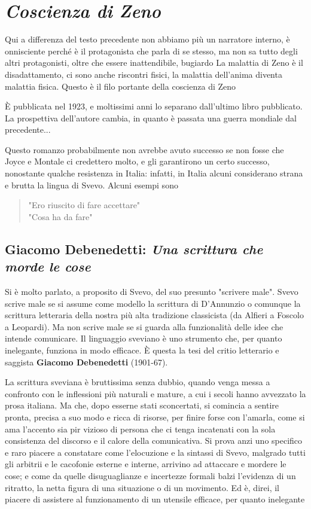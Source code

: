 \documentclass[a4paper, twoside, titlepage]{book}
\newcounter{mar}
\newcommand{\citazione}[1]{%
  \begin{quotation}
  \noindent #1
  \end{quotation}}
\begin{document}
\chapter{\textit{Coscienza di Zeno}}

Qui a differenza del testo precedente non abbiamo più un narratore interno, è onnisciente perché è il protagonista che parla di se stesso, ma non sa tutto degli altri protagonisti, oltre che essere inattendibile, bugiardo
La malattia di Zeno è il disadattamento, ci sono anche riscontri fisici, la malattia dell’anima diventa malattia fisica. Questo è il filo portante della coscienza di Zeno

È pubblicata nel 1923, e moltissimi anni lo separano dall'ultimo libro pubblicato.
La prospettiva dell'autore cambia, in quanto è passata una guerra mondiale dal precedente...

Questo romanzo probabilmente non avrebbe avuto successo se non fosse che Joyce e Montale ci credettero molto, e gli garantirono un certo successo, nonostante qualche resistenza in Italia: infatti, in Italia alcuni considerano strana e brutta la lingua di Svevo. Alcuni esempi sono
\citazione{"Ero riuscito di fare accettare"\\
"Cosa ha da fare"}

\section{Giacomo Debenedetti: \textit{Una scrittura che morde le cose}}
Si è molto parlato, a proposito di Svevo, del suo presunto "scrivere male". Svevo scrive male se si assume come modello la scrittura di D'Annunzio o comunque la scrittura letteraria della nostra più alta tradizione classicista (da Alfieri a Foscolo a Leopardi). Ma non scrive male se si guarda alla funzionalità delle idee che intende comunicare. Il linguaggio sveviano è uno strumento che, per quanto inelegante, funziona in modo efficace. È questa la tesi del critio letterario e saggista \textbf{Giacomo Debenedetti} (1901-67).

La scrittura sveviana è bruttissima senza dubbio, quando venga messa a confronto con le inflessioni più naturali e mature, a cui i secoli hanno avvezzato la prosa italiana. Ma che, dopo esserne stati sconcertati, si comincia a sentire pronta, precisa a suo modo e ricca di risorse, per finire forse con l'amarla, come si ama l'accento sia pir vizioso di persona che ci tenga incatenati con la sola consistenza del discorso e il calore della comunicativa. Si prova anzi uno specifico e raro piacere a constatare come l'elocuzione e la sintassi di Svevo, malgrado tutti gli arbitrii e le cacofonie esterne e interne, arrivino ad attaccare e mordere le cose; e come da quelle disuguaglianze e incertezze formali balzi l'evidenza di un ritratto, la netta figura di una situazione o di un movimento. Ed è, direi, il piacere di assistere al funzionamento di un utensile efficace, per quanto inelegante
\end{document}
